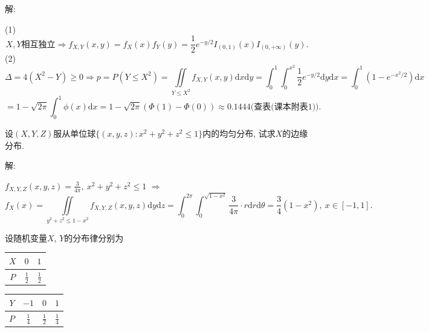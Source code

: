 \documentclass[standard]{ExBook}
\renewenvironment{shaded}{%
  \def\FrameCommand{\fboxsep=\FrameSep \colorbox{shadecolor}}%
  \MakeFramed{\advance\hsize-\width \FrameRestore}%
}{%
  \endMakeFramed
}
\begin{document}
\begin{qitems}
解: 

(1)
$$X,Y\text{相互独立} \Longrightarrow f_{X,Y}(x,y)=f_{X}(x)f_{Y}(y)=\displaystyle\frac{1}{2}e^{-y/2}I_{(0,1)}(x)I_{(0,+\infty)}(y).$$
(2)
$$\Delta=4(X^2-Y)\geq 0 \Longrightarrow p=P(Y\leq X^2)=\displaystyle\iint\limits_{Y\leq X^2}f_{X,Y}(x,y)\mathrm{d}x\mathrm{d}y=\int_{0}^{1}\int_{0}^{x^2}\frac{1}{2}e^{-y/2}\mathrm{d}y\mathrm{d}x=\int_{0}^{1}(1-e^{-x^2/2})\mathrm{d}x$$
$$=1-\sqrt{2\pi}\int_{0}^{1}\phi(x)\mathrm{d}x=1-\sqrt{2\pi}(\Phi(1)-\Phi(0))\approx0.1444\text{(查表(课本附表1))}.$$

\vspace{2.5cm-5em}

    \begin{bbox}
    \begin{shaded}
        \qitem
设$(X,Y,Z)$服从单位球$\{(x,y,z):x^2+y^2+z^2\leq 1\}$内的均匀分布, 试求$X$的边缘分布.
    \end{shaded}
    \end{bbox}

\vspace{\dimexpr2.5cm-5em\relax}

解: 

$f_{X,Y,Z}(x,y,z)=\frac{3}{4\pi},\ x^2+y^2+z^2\leq1$ $\Longrightarrow$
$$f_{X}(x)=\iint\limits_{y^2+z^2\leq 1-x^2}f_{X,Y,Z}(x,y,z)\mathrm{d}y\mathrm{d}z=\int_{0}^{2\pi}\int_{0}^{\sqrt{1-x^2}}\frac{3}{4\pi}\cdot r\mathrm{d}r\mathrm{d}\theta=\frac{3}{4}(1-x^2),\ x\in[-1,1].$$

\vspace{2.5cm-5em}

    \begin{bbox}
    \begin{shaded}
        \qitem
设随机变量$X$, $Y$的分布律分别为

\vspace{0.5em}
\renewcommand{\arraystretch}{1.2}
\setlength{\tabcolsep}{2em}
\begin{minipage}[c]{0.39\textwidth}
\centering
\begin{tabular}{c|cc}
    $X$ & $0$ & $1$\\
    \hline
    $P$ & $\displaystyle\frac{1}{2}$ & $\displaystyle\frac{1}{2}$
\end{tabular}
\end{minipage}
\begin{minipage}[c]{0.6\textwidth}
\centering
\begin{tabular}{c|ccc}
    $Y$ & $-1$ & $0$ & $1$\\
    \hline
    $P$ & $\displaystyle\frac{1}{4}$ & $\displaystyle\frac{1}{2}$ & $\displaystyle\frac{1}{4}$
\end{tabular}
\end{minipage}
\vspace{0.2em}


\end{shaded}
\end{bbox}
\end{qitems}
\end{document}
